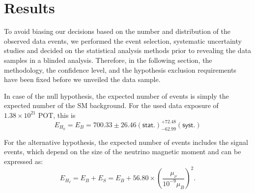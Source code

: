 \section{Results}\label{sec:NuMMResults}

To avoid biasing our decisions based on the number and distribution of the observed data events, we performed the event selection, systematic uncertainty studies and decided on the statistical analysis methods prior to revealing the data samples in a blinded analysis. Therefore, in the following section, the methodology, the confidence level, and the hypothesis exclusion requirements have been fixed before we unveiled the data sample.

In case of the null hypothesis, the expected number of events is simply the expected number of the \gls{SM} background. For the used data exposure of $1.38\times 10^{21}$ \gls{POT}, this is
\begin{equation}
E_{H_0}=E_B=700.33 \pm 26.46\left(\textsf{stat.}\right) ^{+72.48}_{-62.99}\left(\textsf{syst.}\right)
\end{equation}

For the alternative hypothesis, the expected number of events includes the signal events, which depend on the size of the neutrino magnetic moment and can be expressed as:
\begin{equation}\label{eq:NuMMExpectedNumberOfSignalEvents}
E_{H_I}=E_B+E_S=E_B+56.80\times\left(\frac{\mu_\nu}{10^{-9}\mu_B}\right)^2.
\end{equation}


